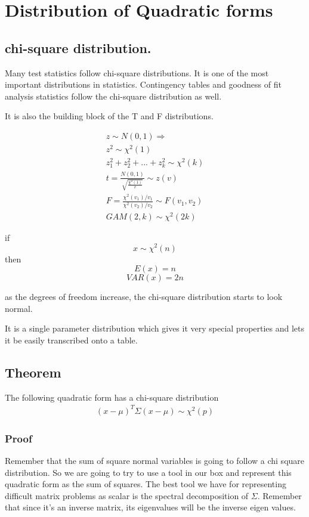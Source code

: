 \section{Distribution of Quadratic forms}
\subsection{chi-square distribution.}

Many test statistics follow chi-square distributions. It is one of the most important distributions in statistics. Contingency tables and goodness of fit analysis statistics follow the chi-square distribution as well.

It is also the building block of the T and F distributions.

\begin{gather}
    z \sim N(0,1) \Rightarrow \\
    z^2 \sim \chi^2(1)\\
    z^2_1 + z^2_2 + ...+ z^2_k \sim \chi^2(k)\\
    t = \frac{N(0,1)}{\sqrt{\frac{\chi^2(1)}{v}}}\sim z(v)\\
    F = \frac{\chi^2(v_1)/v_1}{\chi^2(v_2)/v_2}\sim F(v_1,v_2)\\
    GAM(2,k)\sim \chi^2(2k)
\end{gather}

if \[x\sim \chi^2(n)\] then
\[E(x) = n\]
\[VAR(x) = 2n\]

as the degrees of freedom increase, the chi-square distribution starts to look normal.

It is a single parameter distribution which gives it very special properties and lets it be easily transcribed onto a table.
\subsection{Theorem}
The following quadratic form has a chi-square distribution
\begin{gather*}
    (x-\mu)^T\Sigma(x-\mu) \sim \chi^2(p)
\end{gather*}

\subsubsection{Proof}
Remember that the sum of square normal variables is going to follow a chi square distribution. So we are going to try to use a tool in our box and represent this quadratic form as the sum of squares. The best tool we have for representing difficult matrix problems as scalar is the spectral decomposition of $\Sigma$. Remember that since it's an inverse matrix, its eigenvalues will be the inverse eigen values.

